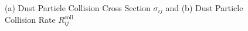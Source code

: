 \vfill

\begin{figure}[h!]
    \centering
    \begin{minipage}{.5\linewidth}
      \centering
    \end{minipage}%
    \begin{minipage}{.5\linewidth}
      \centering
    \end{minipage}
    \caption{
        (a) Dust Particle Collision Cross Section $\sigma_{ij}$ and 
        (b) Dust Particle Collision Rate $R_{ij}^\text{coll}$
    }
\end{figure}
